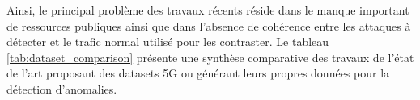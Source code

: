 \documentclass[a4paper,11pt,twoside]{StyleThese}
\begin{document}
\begin{table}[ht]
    \centering
    \caption{Comparaison de différents datasets 5G et de leurs caractéristiques.}
    \label{tab:dataset_comparison}
\end{table}

Ainsi, le principal problème des travaux récents réside dans le manque important de ressources publiques ainsi que dans l’absence de cohérence entre les attaques à détecter et le trafic normal utilisé pour les contraster. Le tableau \ref{tab:dataset_comparison} présente une synthèse comparative des travaux de l’état de l’art proposant des datasets 5G ou générant leurs propres données pour la détection d’anomalies.
\end{document}
